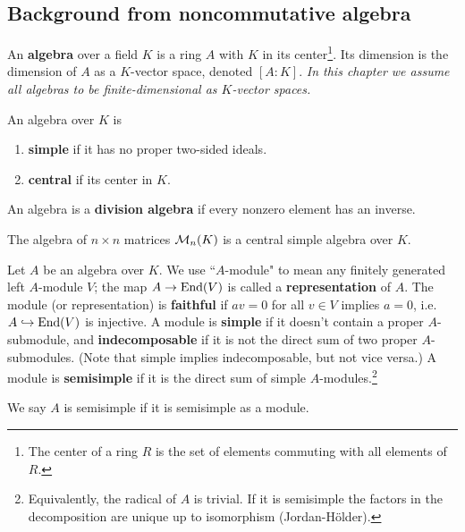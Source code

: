 \subsection{Background from noncommutative algebra}
\begin{df}
An \textbf{algebra} over a field $K$ is a ring $A$ with $K$ in its center\footnote{The center of a ring $R$ is the set of elements commuting with all elements of $R$.}. Its dimension is the dimension of $A$ as a $K$-vector space, denoted $[A:K]$. {\it In this chapter we assume all algebras to be finite-dimensional as $K$-vector spaces.}

An algebra over $K$ is
\begin{enumerate}
\item
\textbf{simple} if it has no proper two-sided ideals.
\item
\textbf{central} if its center in $K$.
\end{enumerate}
An algebra is a \textbf{division algebra} if every nonzero element has an inverse.
\end{df}
\begin{ex}
The algebra of $n\times n$ matrices $\cal M_n(K)$ is a central simple algebra over $K$.
\end{ex}
\begin{df}
Let $A$ be an algebra over $K$. We use ``$A$-module" to mean any finitely generated left $A$-module $V$; the map $A\to \End(V)$ is called a \textbf{representation} of $A$. The module (or representation) is \textbf{faithful} if $av=0$ for all $v\in V$ implies $a=0$, i.e. $A\hra \End(V)$ is injective. A module is \textbf{simple} if it doesn't contain a proper $A$-submodule, and \textbf{indecomposable} if it is not the direct sum of two proper $A$-submodules. (Note that simple implies indecomposable, but not vice versa.) A module is \textbf{semisimple} if it is the direct sum of simple $A$-modules.\footnote{Equivalently, the radical of $A$ is trivial. If it is semisimple the factors in the decomposition are unique up to isomorphism (Jordan-H\"older).}

We say $A$ is semisimple if it is semisimple as a module.
\end{df}


